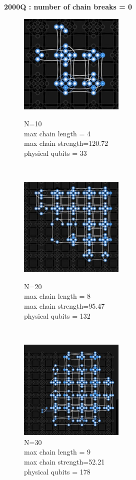 \documentclass[oneside,a4paper]{article}
\begin{document}
\textbf{2000Q : number of chain breaks = 0}
\begin{figure}[htp]
\begin{minipage}[b]{4.5cm}
\includegraphics[width=5cm]{LaTeXTemplate/Images/2000QN10.png}
\caption{N=10\\max chain length = 4\\max chain strength=120.72\\physical qubits = 33}
\end{minipage}
\ \hspace{2mm} \hspace{2mm} \
\begin{minipage}[b]{4.5cm}
\includegraphics[width=5cm]{LaTeXTemplate/Images/2000QN20.png}
\caption{N=20\\max chain length = 8\\max chain strength=95.47\\physical qubits = 132}
\end{minipage}
\ \hspace{2mm} \hspace{2mm} \
\begin{minipage}[b]{4.5cm}
\centering
\includegraphics[width=5cm]{LaTeXTemplate/Images/2000QN30.png}
\caption{N=30\\max chain length = 9\\max chain strength=52.21\\physical qubits = 178}
\end{minipage}
\end{figure}
\end{document}
